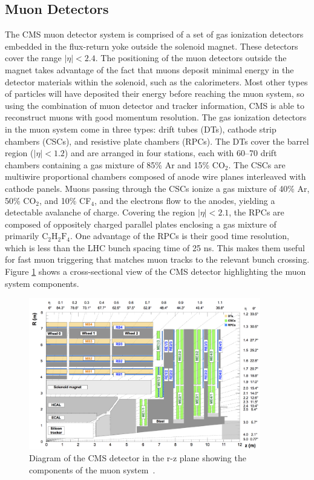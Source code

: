 \subsection{Muon Detectors}
The CMS muon detector system is comprised of a set of gas ionization detectors embedded in the flux-return yoke outside the solenoid magnet. 
These detectors cover the range $|\eta| < 2.4$. The positioning of the muon detectors outside the magnet takes advantage of the fact that muons deposit minimal energy in the detector 
materials within the solenoid, such as the calorimeters. Most other types of particles will have deposited their energy before reaching the muon system, so using the combination of muon detector and tracker information, CMS is able to reconstruct muons with good momentum resolution. The gas ionization detectors in the muon system come in three types: drift tubes (DTs), cathode strip chambers (CSCs), and 
resistive plate chambers (RPCs). The DTs cover the barrel region ($|\eta| < 1.2$) and are arranged in four stations, each with 60--70 drift chambers containing a gas mixture of 85\% Ar and 15\% CO$_2$.
The CSCs are multiwire proportional chambers composed of anode wire planes interleaved with cathode panels. Muons passing through the CSCs ionize a gas mixture of 40\% Ar, 50\% CO$_2$, and 10\% CF$_4$, 
and the electrons flow to the anodes, yielding a detectable avalanche of charge. Covering the region $|\eta| < 2.1$, the RPCs are composed of oppositely charged parallel plates enclosing a gas mixture 
of primarily $\mathrm{C}_2\mathrm{H}_2\mathrm{F}_4$. One advantage of the RPCs is their good time resolution, which is less than the LHC bunch spacing time of 25 ns. This makes them useful for fast muon triggering that matches
muon tracks to the relevant bunch crossing. Figure \ref{fig:muon_system} shows a cross-sectional view of the CMS detector highlighting the muon system components. 

\begin{figure}[tb]
  \centering
   \includegraphics[width=0.9\textwidth]{fig/experiment/detector/muon_sys_r-z.png}
	\caption[Diagram of the CMS detector in the r-z plane showing the components of the muon system.]
	{Diagram of the CMS detector in the r-z plane showing the components of the muon system~\cite{CMS:2008xjf}.}
	\label{fig:muon_system}
\end{figure}

